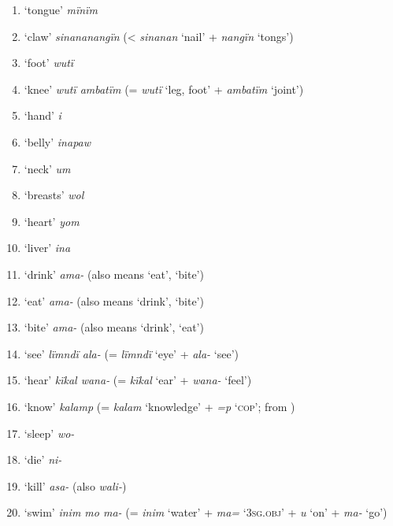\begin{enumerate}[noitemsep, label={\arabic*}, align=left, widest=190, labelsep=1ex,leftmargin=*]
\item ‘tongue’ \textit{mïnïm}

\item ‘claw’ \textit{sinananangïn} (< \textit{sinanan} ‘nail’ + \textit{nangïn} ‘tongs’)

\item ‘foot’ \textit{wutï}

\item ‘knee’ \textit{wutï ambatïm} (= \textit{wutï} ‘leg, foot’ + \textit{ambatïm} ‘joint’)

\item ‘hand’ \textit{i}

\item ‘belly’ \textit{inapaw}

\item ‘neck’ \textit{um}

\item ‘breasts’ \textit{wol}

\item ‘heart’ \textit{yom}

\item ‘liver’ \textit{ina}

\item ‘drink’ \textit{ama-} (also means ‘eat’, ‘bite’)

\item ‘eat’ \textit{ama-} (also means ‘drink’, ‘bite’)

\item ‘bite’ \textit{ama-} (also means ‘drink’, ‘eat’)

\item ‘see’ \textit{lïmndï ala-} (= \textit{lïmndï} ‘eye’ + \textit{ala-} ‘see’)

\item ‘hear’ \textit{kïkal wana-} (= \textit{kïkal} ‘ear’ + \textit{wana-} ‘feel’)

\item ‘know’ \textit{kalamp} (= \textit{kalam} ‘knowledge’ + \textit{=p} ‘\textsc{cop}’;  from )

\item ‘sleep’ \textit{wo-}

\item ‘die’ \textit{ni-}

\item ‘kill’ \textit{asa-} (also \textit{wali-})

\item ‘swim’ \textit{inim mo ma-} (= \textit{inim} ‘water’ + \textit{ma=} ‘3\textsc{sg.obj}’ + \textit{u} ‘on’ + \textit{ma-} ‘go’)


\end{enumerate}
